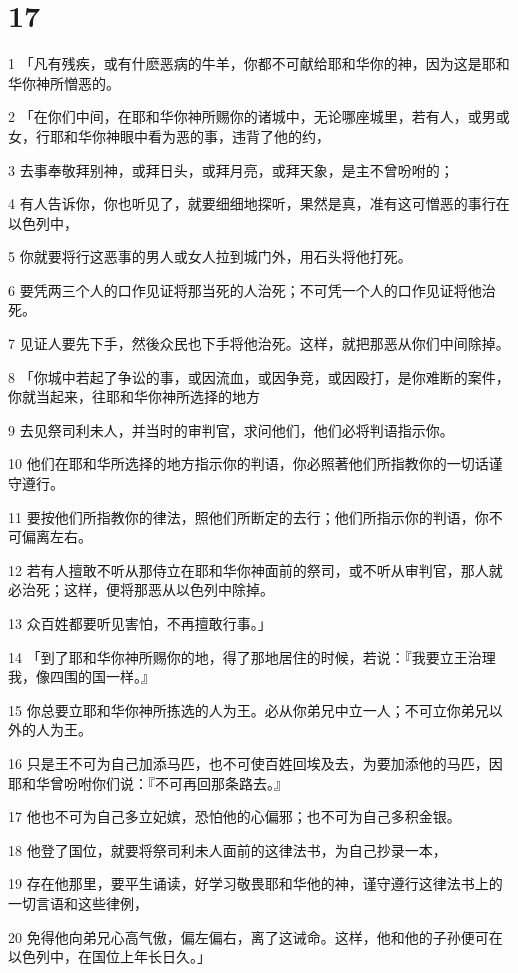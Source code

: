 \chapter{17}

\par 1 「凡有残疾，或有什麽恶病的牛羊，你都不可献给耶和华你的神，因为这是耶和华你神所憎恶的。
\par 2 「在你们中间，在耶和华你神所赐你的诸城中，无论哪座城里，若有人，或男或女，行耶和华你神眼中看为恶的事，违背了他的约，
\par 3 去事奉敬拜别神，或拜日头，或拜月亮，或拜天象，是主不曾吩咐的；
\par 4 有人告诉你，你也听见了，就要细细地探听，果然是真，准有这可憎恶的事行在以色列中，
\par 5 你就要将行这恶事的男人或女人拉到城门外，用石头将他打死。
\par 6 要凭两三个人的口作见证将那当死的人治死；不可凭一个人的口作见证将他治死。
\par 7 见证人要先下手，然後众民也下手将他治死。这样，就把那恶从你们中间除掉。
\par 8 「你城中若起了争讼的事，或因流血，或因争竞，或因殴打，是你难断的案件，你就当起来，往耶和华你神所选择的地方
\par 9 去见祭司利未人，并当时的审判官，求问他们，他们必将判语指示你。
\par 10 他们在耶和华所选择的地方指示你的判语，你必照著他们所指教你的一切话谨守遵行。
\par 11 要按他们所指教你的律法，照他们所断定的去行；他们所指示你的判语，你不可偏离左右。
\par 12 若有人擅敢不听从那侍立在耶和华你神面前的祭司，或不听从审判官，那人就必治死；这样，便将那恶从以色列中除掉。
\par 13 众百姓都要听见害怕，不再擅敢行事。」
\par 14 「到了耶和华你神所赐你的地，得了那地居住的时候，若说：『我要立王治理我，像四围的国一样。』
\par 15 你总要立耶和华你神所拣选的人为王。必从你弟兄中立一人；不可立你弟兄以外的人为王。
\par 16 只是王不可为自己加添马匹，也不可使百姓回埃及去，为要加添他的马匹，因耶和华曾吩咐你们说：『不可再回那条路去。』
\par 17 他也不可为自己多立妃嫔，恐怕他的心偏邪；也不可为自己多积金银。
\par 18 他登了国位，就要将祭司利未人面前的这律法书，为自己抄录一本，
\par 19 存在他那里，要平生诵读，好学习敬畏耶和华他的神，谨守遵行这律法书上的一切言语和这些律例，
\par 20 免得他向弟兄心高气傲，偏左偏右，离了这诫命。这样，他和他的子孙便可在以色列中，在国位上年长日久。」

